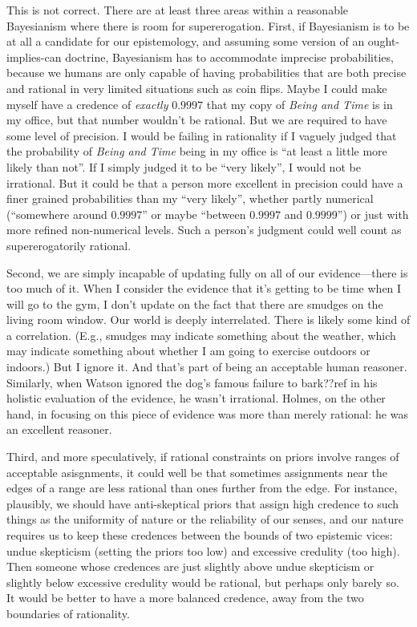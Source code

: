 This is not correct. There are at least three areas within a reasonable Bayesianism where there is room for supererogation.
First, if Bayesianism is to be at all a candidate for our epistemology, and assuming some version of an ought-implies-can doctrine,
Bayesianism has to accommodate imprecise probabilities, because we humans are only capable of having  
probabilities that are both precise and rational in very limited situations such as coin flips. Maybe I could make myself
have a credence of \textit{exactly} $0.9997$ that my copy of \textit{Being and Time} is in my office, but that number wouldn't 
be rational. But we are required to have some level of precision. I would be failing in rationality if I vaguely judged
that the probability of \textit{Being and Time} being in my office is ``at least a little more likely than not''. If I
simply judged it to be ``very likely'', I would not be irrational. But it could be that a person more excellent in precision
could have a finer grained probabilities than my ``very likely'', whether partly numerical (``somewhere around $0.9997$'' or
maybe ``between $0.9997$ and $0.9999$'') or just with more refined non-numerical levels. Such a person's judgment could well
count as supererogatorily rational. 

Second, we are simply incapable of updating fully on all of our evidence---there is too much of it. When
I consider the evidence that it's getting to be time when I will go to the gym, I don't update on the fact that there are
smudges on the living room window. Our world is deeply interrelated. There is likely some kind of a correlation. (E.g.,
smudges may indicate something about the weather, which may indicate something about whether I am going to exercise outdoors
or indoors.) But I ignore it. And that's part of being an acceptable human reasoner. Similarly, when Watson ignored the dog's
famous failure to bark??ref in his holistic evaluation of the evidence, he wasn't irrational. Holmes, on the other hand, in focusing
on this piece of evidence was more than merely rational: he was an excellent reasoner. 

Third, and more speculatively, if rational constraints on priors involve ranges of acceptable asisgnments, it could well be that 
sometimes assignments near the edges of a range are less rational than ones further from the edge. For instance, plausibly, we 
should have anti-skeptical priors that assign high credence to such things as the uniformity of nature or the reliability of 
our senses, and our nature requires us to keep these credences between the bounds of two epistemic vices: undue skepticism (setting 
the priors too low) and excessive credulity (too high). Then someone whose credences are just slightly above undue skepticism 
or slightly below excessive credulity would be rational, but perhaps only barely so. It would be better to have a more balanced
credence, away from the two boundaries of rationality.

